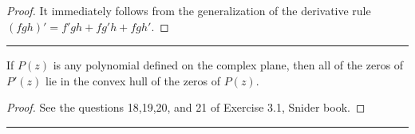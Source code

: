 \begin{proof}
	It immediately follows from the generalization of the derivative rule $(fgh)' = f'gh + fg'h + fgh'.$
\end{proof}

\hrule

\begin{fact}
	If $P(z)$ is any polynomial defined on the complex plane, then all of the zeros of $P'(z)$ lie in the convex hull of the zeros of $P(z)$.
\end{fact}

\begin{proof}
	See the questions 18,19,20, and 21 of Exercise 3.1, Snider book. 
\end{proof}

\hrule


